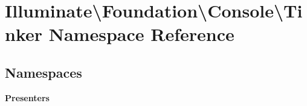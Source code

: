 \section{Illuminate\textbackslash{}Foundation\textbackslash{}Console\textbackslash{}Tinker Namespace Reference}
\label{namespace_illuminate_1_1_foundation_1_1_console_1_1_tinker}
\subsection*{Namespaces}
\begin{DoxyCompactItemize}
\item 
 {\bf Presenters}
\end{DoxyCompactItemize}
